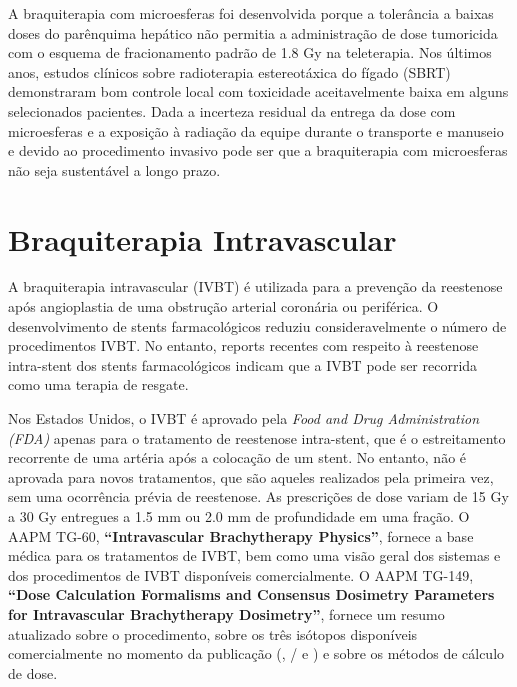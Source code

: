 \documentclass[11pt,a4paper]{article}
\begin{document}
    A braquiterapia com microesferas foi desenvolvida porque a tolerância a baixas doses do parênquima hepático não permitia a administração de dose tumoricida com o esquema de fracionamento padrão de 1.8 Gy na teleterapia. Nos últimos anos, estudos clínicos sobre radioterapia estereotáxica do fígado (SBRT) demonstraram bom controle local com toxicidade aceitavelmente baixa em alguns selecionados pacientes. Dada a incerteza residual da entrega da dose com microesferas e a exposição à radiação da equipe durante o transporte e manuseio e devido ao procedimento invasivo pode ser que a braquiterapia com microesferas não seja sustentável a longo prazo.

\section{Braquiterapia Intravascular}

    A braquiterapia intravascular (IVBT) é utilizada para a prevenção da reestenose após angioplastia de uma obstrução arterial coronária ou periférica. O desenvolvimento de stents farmacológicos reduziu consideravelmente o número de procedimentos IVBT. No entanto, reports recentes com respeito à reestenose intra-stent dos stents farmacológicos indicam que a IVBT pode ser recorrida como uma terapia de resgate. 

    Nos Estados Unidos, o IVBT é aprovado pela \textit{Food and Drug Administration (FDA)} apenas para o tratamento de reestenose intra-stent, que é o estreitamento recorrente de uma artéria após a colocação de um stent. No entanto, não é aprovada para novos tratamentos, que são aqueles realizados pela primeira vez, sem uma ocorrência prévia de reestenose. As prescrições de dose variam de 15 Gy a 30 Gy entregues a 1.5 mm ou 2.0 mm de profundidade em uma fração. O  AAPM TG-60, \textbf{``Intravascular Brachytherapy Physics''}, fornece a base médica para os tratamentos de IVBT, bem como uma visão geral dos sistemas e dos procedimentos de IVBT disponíveis comercialmente. O AAPM TG-149, \textbf{``Dose Calculation Formalisms and Consensus Dosimetry Parameters for Intravascular Brachytherapy Dosimetry''}, fornece um resumo atualizado sobre o procedimento, sobre os três isótopos disponíveis comercialmente no momento da publicação (, / e  ) e sobre os métodos de cálculo de dose.
\end{document}

